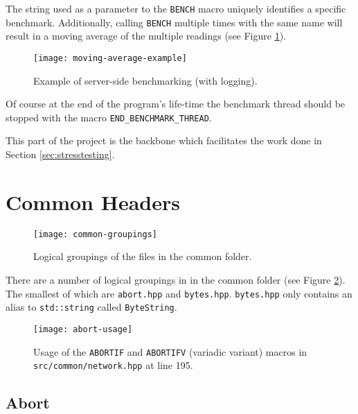 \documentclass[article]{uom-coursework}
\begin{document}
\begin{note}
    The string used as a parameter to the \texttt{BENCH} macro
    uniquely identifies a specific benchmark. Additionally,
    calling \texttt{BENCH} multiple times with the same name
    will result in a moving average of the multiple readings
    (see Figure \ref{fig:serversidebenching}).
\end{note}

\begin{figure}[H]
\centering
\texttt{[image: moving-average-example]}
\caption{Example of server-side benchmarking (with logging).}
\label{fig:serversidebenching}
\end{figure}

Of course at the end of the program's life-time the benchmark
thread should be stopped with the macro
\texttt{END\_BENCHMARK\_THREAD}.

This part of the project is the backbone which facilitates the
work done in Section \ref{sec:stresstesting}.

\section{Common Headers}

\begin{figure}[H]
\centering
\begin{mdframed}[backgroundcolor=OffWhite]
\texttt{[image: common-groupings]}
\end{mdframed}
\caption{Logical groupings of the files in the common folder.}
\label{fig:commongroups}
\end{figure}

There are a number of logical groupings in in the common folder
(see Figure \ref{fig:commongroups}). The smallest of which are
\texttt{abort.hpp} and \texttt{bytes.hpp}. \texttt{bytes.hpp}
only contains an alias to \texttt{std::string} called
\texttt{ByteString}.

\begin{figure}[H]
\centering
\texttt{[image: abort-usage]}
\caption{Usage of the \texttt{ABORTIF} and \texttt{ABORTIFV}
(variadic variant) macros in \texttt{src/common/network.hpp} at line
195.}
\label{fig:abortusage}
\end{figure}

\subsection{Abort}
\end{document}
